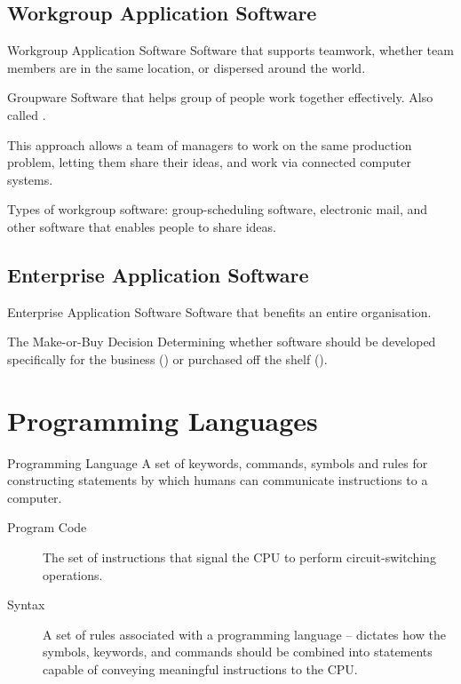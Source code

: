 \documentclass[\main/notes.tex]{subfiles}
\begin{document}
			\subsection{Workgroup Application Software}
				\begin{definition}{Workgroup Application Software}
					Software that supports teamwork, whether team members are in the same location, or dispersed around the world.
				\end{definition}
				\begin{definition}{Groupware}
					Software that helps group of people work together effectively. Also called .

					This approach allows a team of managers to work on the same production problem, letting them share their ideas, and work via connected computer systems.
				\end{definition}
				\begin{example}
					Types of workgroup software: group-scheduling software, electronic mail, and other software that enables people to share ideas.
				\end{example}
			\subsection{Enterprise Application Software}
				\begin{definition}{Enterprise Application Software}
					Software that benefits an entire organisation.
				\end{definition}
				\begin{definition}{The Make-or-Buy Decision}
					Determining whether software should be developed specifically for the business () or purchased off the shelf ().
				\end{definition}

		\section{Programming Languages}
			\begin{definition}{Programming Language}
				A set of keywords, commands, symbols and rules for constructing statements by which humans can communicate instructions to a computer.
				\begin{description}
					\item[Program Code] The set of instructions that signal the CPU to perform circuit-switching operations.
					\item[Syntax] A set of rules associated with a programming language -- dictates how the symbols, keywords, and commands should be combined into statements capable of conveying meaningful instructions to the CPU. 
				\end{description}
			\end{definition}
			\pagebreak
\end{document}
